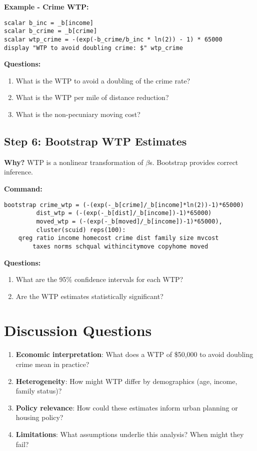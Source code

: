\documentclass[12pt]{article}
\begin{document}
\textbf{Example - Crime WTP:}
\begin{verbatim}
scalar b_inc = _b[income]
scalar b_crime = _b[crime]
scalar wtp_crime = -(exp(-b_crime/b_inc * ln(2)) - 1) * 65000
display "WTP to avoid doubling crime: $" wtp_crime
\end{verbatim}

\textbf{Questions:}
\begin{enumerate}
    \item What is the WTP to avoid a doubling of the crime rate?
    \item What is the WTP per mile of distance reduction?
    \item What is the non-pecuniary moving cost?
\end{enumerate}

\subsection{Step 6: Bootstrap WTP Estimates}

\textbf{Why?} WTP is a nonlinear transformation of $\beta$s. Bootstrap provides correct inference.

\textbf{Command:}
\begin{verbatim}
bootstrap crime_wtp = (-(exp(-_b[crime]/_b[income]*ln(2))-1)*65000)
         dist_wtp = (-(exp(-_b[dist]/_b[income])-1)*65000)
         moved_wtp = (-(exp(-_b[moved]/_b[income])-1)*65000),
         cluster(scuid) reps(100):
    qreg ratio income homecost crime dist family size mvcost 
        taxes norms schqual withincitymove copyhome moved
\end{verbatim}

\textbf{Questions:}
\begin{enumerate}
    \item What are the 95\% confidence intervals for each WTP?
    \item Are the WTP estimates statistically significant?
\end{enumerate}

\section{Discussion Questions}

\begin{enumerate}
    \item \textbf{Economic interpretation}: What does a WTP of \$50,000 to avoid doubling crime mean in practice?
    
    \item \textbf{Heterogeneity}: How might WTP differ by demographics (age, income, family status)?
    
    \item \textbf{Policy relevance}: How could these estimates inform urban planning or housing policy?
    
    \item \textbf{Limitations}: What assumptions underlie this analysis? When might they fail?
\end{enumerate}
\end{document}
